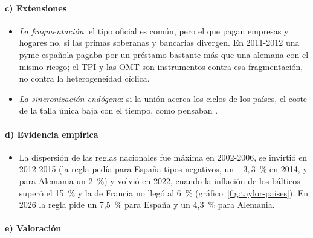 \documentclass[11pt]{article}
\begin{document}
\paragraph{c) Extensiones}

\begin{itemize}
\item \emph{La fragmentación}: el tipo oficial es común, pero el que pagan empresas y hogares no, si las primas soberanas y bancarias divergen. En 2011-2012 una pyme española pagaba por un préstamo bastante más que una alemana con el mismo riesgo; el TPI y las OMT son instrumentos contra esa fragmentación, no contra la heterogeneidad cíclica.
\item \emph{La sincronización endógena}: si la unión acerca los ciclos de los países, el coste de la talla única baja con el tiempo, como pensaban \textcite{FrankelRose1998Endogeneity} .
\end{itemize}

\paragraph{d) Evidencia empírica}

\begin{itemize}
\item La dispersión de las reglas nacionales fue máxima en 2002-2006, se invirtió en 2012-2015 (la regla pedía para España tipos negativos, un $-3{,}3$~\% en 2014, y para Alemania un 2~\%) y volvió en 2022, cuando la inflación de los bálticos superó el 15~\% y la de Francia no llegó al 6~\% (gráfico~\ref{fig:taylor-paises}). En 2026 la regla pide un 7,5~\% para España y un 4,3~\% para Alemania.
\end{itemize}

\paragraph{e) Valoración}
\end{document}
